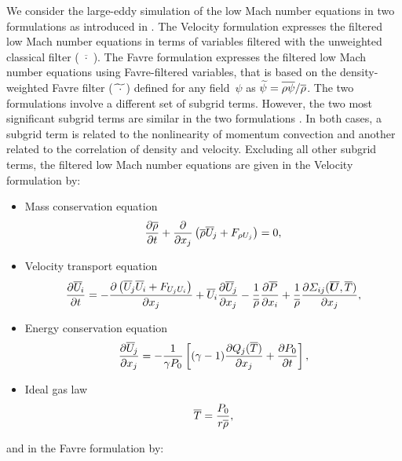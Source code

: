 We consider the large-eddy simulation of the
low Mach number equations in two formulations as introduced in \cite{dupuy2018study}. The Velocity formulation
expresses the filtered low Mach number equations in terms of variables
filtered with the unweighted classical filter ($\overline{\,\,\cdot\,\,}$).
The Favre formulation expresses the filtered low Mach number equations using
Favre-filtered variables,
that is based on the density-weighted Favre filter ($\widetilde{\,\,\,\cdot\,\,}$)
defined for any field~$\psi$ as $\widetilde{\psi} = \overline{\rho \psi} / \overline{\rho}$.
The two formulations involve a different set of subgrid terms.
However, the two most significant subgrid terms are similar in the two
formulations \cite{dupuy2016, dupuy2017sft, dupuy2018study}.
In both cases, a subgrid term is related to the nonlinearity of momentum
convection and another related to the correlation of density and velocity.
Excluding all other subgrid terms, the filtered low Mach number equations are
given in the Velocity formulation by:
\begin{itemize}
\item Mass conservation equation
\begin{equation}
\frac{\partial \overline{\rho}}{\partial t} + \frac{\partial }{\partial x_j}\left(\overline{\rho} \overline{U}_{\!j} + F_{\rho U_j}\right) = 0,
\end{equation}
\item Velocity transport equation
\begin{equation}
\begin{aligned}
\frac{\partial \overline{U}_{\!i}}{\partial t} = - \frac{\partial \left(\smash[t]{\overline{U}_{\!j} \overline{U}_{\!i} + F_{U_j U_i}}\right)}{\partial x_j} + \overline{U}_{\!i} \frac{\partial \overline{U}_{\!j}}{\partial x_j} - \frac{1}{\overline{\rho}}\frac{\partial \overline{P}}{\partial x_i} + \frac{1}{\overline{\rho}} \frac{\partial \varSigma_{ij}(\boldsymbol{\overline{U}}, \overline{T})}{\partial x_j},
\end{aligned}
\end{equation}
\item Energy conservation equation
\begin{equation}
\frac{\partial \overline{U}_{\!j}}{\partial x_j} = - \frac{1}{\gamma P_{0}}\left[ (\gamma - 1)\frac{\partial Q_j(\overline{T})}{\partial x_j} + \frac{\partial P_{0}}{\partial t} \right],
\end{equation}
\item Ideal gas law
\begin{equation}
\overline{T} = \frac{P_{0}}{r \overline{\rho}},
\end{equation}
\end{itemize}
and in the Favre formulation by:
